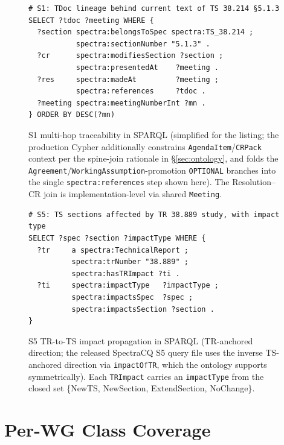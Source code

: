 \begin{figure}[h]
\centering
\scriptsize
\begin{minipage}{0.95\textwidth}
\begin{verbatim}
# S1: TDoc lineage behind current text of TS 38.214 §5.1.3
SELECT ?tdoc ?meeting WHERE {
  ?section spectra:belongsToSpec spectra:TS_38.214 ;
           spectra:sectionNumber "5.1.3" .
  ?cr      spectra:modifiesSection ?section ;
           spectra:presentedAt    ?meeting .
  ?res     spectra:madeAt         ?meeting ;
           spectra:references     ?tdoc .
  ?meeting spectra:meetingNumberInt ?mn .
} ORDER BY DESC(?mn)
\end{verbatim}
\end{minipage}
\caption{S1 multi-hop traceability in SPARQL (simplified for the listing; the production Cypher additionally constrains \texttt{AgendaItem}/\texttt{CRPack} context per the spine-join rationale in §\ref{sec:ontology}, and folds the \texttt{Agreement}/\texttt{WorkingAssumption}-promotion \texttt{OPTIONAL} branches into the single \texttt{spectra:references} step shown here). The Resolution--CR join is implementation-level via shared \texttt{Meeting}.}
\label{lst:sparql-s1}
\end{figure}

\begin{figure}[h]
\centering
\scriptsize
\begin{minipage}{0.95\textwidth}
\begin{verbatim}
# S5: TS sections affected by TR 38.889 study, with impact type
SELECT ?spec ?section ?impactType WHERE {
  ?tr     a spectra:TechnicalReport ;
          spectra:trNumber "38.889" ;
          spectra:hasTRImpact ?ti .
  ?ti     spectra:impactType   ?impactType ;
          spectra:impactsSpec  ?spec ;
          spectra:impactsSection ?section .
}
\end{verbatim}
\end{minipage}
\caption{S5 TR-to-TS impact propagation in SPARQL (TR-anchored direction; the released SpectraCQ S5 query file uses the inverse TS-anchored direction via \texttt{impactOfTR}, which the ontology supports symmetrically). Each \texttt{TRImpact} carries an \texttt{impactType} from the closed set \{NewTS, NewSection, ExtendSection, NoChange\}.}
\label{lst:sparql-s5}
\end{figure}

\section{Per-WG Class Coverage}\label{app:coverage}

